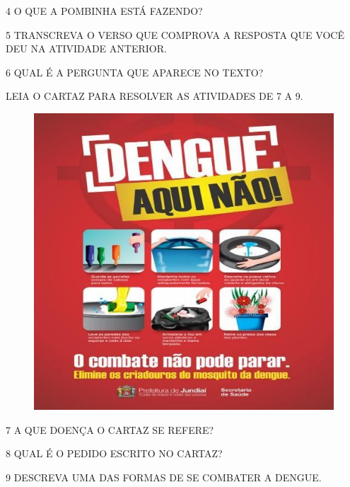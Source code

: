 \num{4} O QUE A POMBINHA ESTÁ FAZENDO?


\num{5} TRANSCREVA O VERSO QUE COMPROVA A RESPOSTA QUE VOCÊ DEU NA ATIVIDADE ANTERIOR.


\num{6} QUAL É A PERGUNTA QUE APARECE NO TEXTO?


LEIA O CARTAZ PARA RESOLVER AS ATIVIDADES DE 7 A 9.

\begin{figure}[H]
\centering
\includegraphics[width=\textwidth]{media/image127.jpg}
\end{figure}

\num{7} A QUE DOENÇA O CARTAZ SE REFERE?


\num{8} QUAL É O PEDIDO ESCRITO NO CARTAZ?


\num{9} DESCREVA UMA DAS FORMAS DE SE COMBATER A DENGUE.




